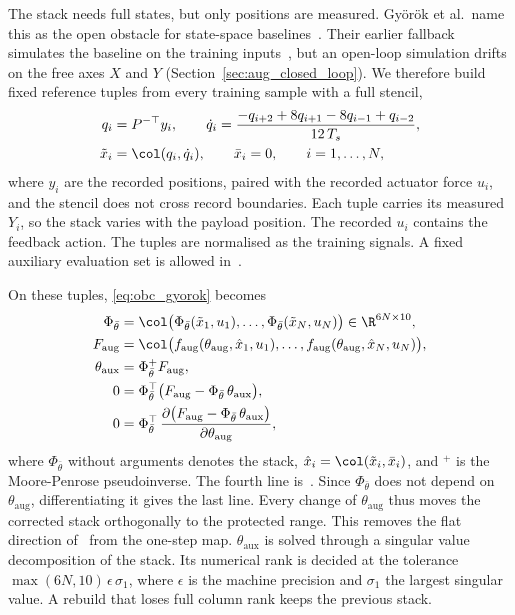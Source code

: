 The stack needs full states, but only positions are measured.
Gy\"or\"ok et al.\ name this as the open obstacle for state-space
baselines~\cite[Sec.~6]{gyorok2026obc}.
Their earlier fallback simulates the baseline on the training
inputs~\cite[Sec.~3]{gyorok2025l4dc}, but an open-loop simulation drifts on
the free axes $X$ and $Y$ (Section~\ref{sec:aug_closed_loop}).
We therefore build fixed reference tuples from every training sample with a
full stencil,
\begin{equation}
\begin{aligned}
 q_i&=P^{-\top}y_i,\qquad
 \dot q_i=\frac{-q_{i+2}+8q_{i+1}-8q_{i-1}+q_{i-2}}{12\,T_s},\\
 \tilde x_i&=\col(q_i,\dot q_i),\qquad \bar x_i=0,\qquad i=1,\dots,N,
\end{aligned}
\label{eq:obc_tuples}
\end{equation}
where $y_i$ are the recorded positions, paired with the recorded actuator
force $u_i$, and the stencil does not cross record boundaries.
Each tuple carries its measured $Y_i$, so the stack varies with the payload
position.
The recorded $u_i$ contains the feedback action.
The tuples are normalised as the training signals.
A fixed auxiliary evaluation set is allowed in~\cite[Sec.~3.2]{gyorok2026obc}.

On these tuples, \eqref{eq:obc_gyorok} becomes
\begin{equation}
\begin{aligned}
 \Phi_{\bar\theta}
 &=\col\bigl(\Phi_{\bar\theta}(\tilde x_1,u_1),\dots,
   \Phi_{\bar\theta}(\tilde x_N,u_N)\bigr)\in\R^{6N\times10},\\
 F_{\mathrm{aug}}
 &=\col\bigl(f_{\mathrm{aug}}(\theta_{\mathrm{aug}},\hat x_1,u_1),\dots,
   f_{\mathrm{aug}}(\theta_{\mathrm{aug}},\hat x_N,u_N)\bigr),\\
 \theta_{\mathrm{aux}}&=\Phi_{\bar\theta}^{+}F_{\mathrm{aug}},\\
 0&=\Phi_{\bar\theta}^\top
   \bigl(F_{\mathrm{aug}}-\Phi_{\bar\theta}\,\theta_{\mathrm{aux}}\bigr),\\
 0&=\Phi_{\bar\theta}^\top\,
   \frac{\partial\bigl(F_{\mathrm{aug}}-\Phi_{\bar\theta}\,
   \theta_{\mathrm{aux}}\bigr)}{\partial\theta_{\mathrm{aug}}},
\end{aligned}
\label{eq:obc_ours}
\end{equation}
where $\Phi_{\bar\theta}$ without arguments denotes the stack,
$\hat x_i=\col(\tilde x_i,\bar x_i)$, and $^{+}$ is the Moore-Penrose
pseudoinverse.
The fourth line is~\cite[Lemma~3]{gyorok2026obc}.
Since $\Phi_{\bar\theta}$ does not depend on $\theta_{\mathrm{aug}}$,
differentiating it gives the last line.
Every change of $\theta_{\mathrm{aug}}$ thus moves the corrected stack
orthogonally to the protected range.
This removes the flat direction of~\cite[Ex.~1]{gyorok2025l4dc} from the
one-step map.
$\theta_{\mathrm{aux}}$ is solved through a singular value decomposition of
the stack.
Its numerical rank is decided at the tolerance
$\max(6N,10)\,\epsilon\,\sigma_1$, where $\epsilon$ is the machine precision
and $\sigma_1$ the largest singular value.
A rebuild that loses full column rank keeps the previous stack.

